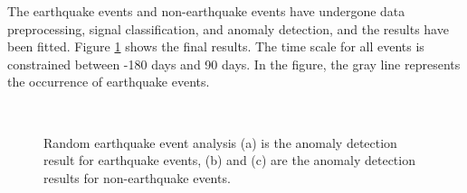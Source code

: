 \documentclass[3p,authoryear,preprint,12pt]{elsarticle}
\begin{document}
The earthquake events and non-earthquake events have undergone data preprocessing, signal classification, and anomaly detection, and the results have been fitted. Figure \ref{fig:random earthquake event analysis} shows the final results. The time scale for all events is constrained between -180 days and 90 days. In the figure, the gray line represents the occurrence of earthquake events.
\begin{figure}[htbp]
	\centering
	 \\
	\caption{Random earthquake event analysis {(a) is the anomaly detection result for earthquake events, (b) and (c) are the anomaly detection results for non-earthquake events.}}
	\label{fig:random earthquake event analysis}
\end{figure}
\end{document}
